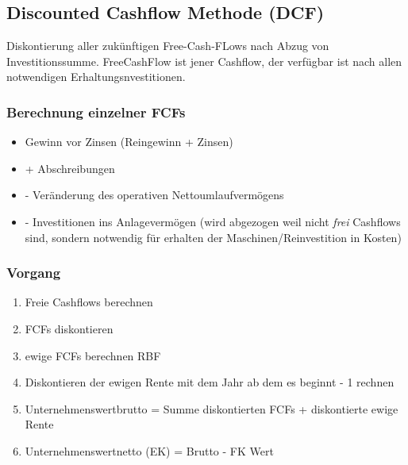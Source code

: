 \subsection{Discounted Cashflow Methode (DCF)}



\begin{definition}
    [DCF] Diskontierung aller zukünftigen Free-Cash-FLows nach Abzug von Investitionssumme. FreeCashFlow ist jener Cashflow, der verfügbar ist nach allen notwendigen Erhaltungsnvestitionen. 
\end{definition}

\subsubsection{Berechnung einzelner FCFs}
\begin{itemize}
    \item Gewinn vor Zinsen (Reingewinn + Zinsen)
    \item + Abschreibungen
    \item - Veränderung des operativen Nettoumlaufvermögens
    \item - Investitionen ins Anlagevermögen (wird abgezogen weil nicht \textit{frei} Cashflows sind, sondern notwendig für erhalten der Maschinen/Reinvestition in Kosten)
\end{itemize}

\subsubsection{Vorgang}
\begin{enumerate}
    \item Freie Cashflows berechnen 
    \item FCFs diskontieren 
    \item ewige FCFs berechnen RBF 
    \item Diskontieren der ewigen Rente mit dem Jahr ab dem es beginnt - 1 rechnen
    \item Unternehmenswertbrutto = Summe diskontierten FCFs + diskontierte ewige Rente 
    \item Unternehmenswertnetto (EK) = Brutto - FK Wert
\end{enumerate}